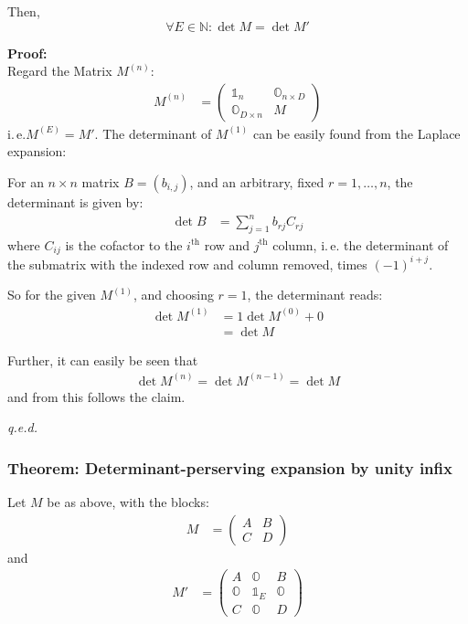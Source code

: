 \documentclass[
	english,
	a4paper,
	fontsize=10pt,
	parskip=half,
	titlepage=true,
	DIV=12,
	final
]{scrreprt}
\newcommand*{\ie}{i.\,e.\xspace}
\newcommand*{\setNaturals} {\ensuremath{\mathbb{N}}}
\begin{document}
Then,
\begin{equation}
	\forall E \in \setNaturals : \det M = \det M'
\end{equation}

\textbf{Proof:}\\
Regard the Matrix $M^{(n)}$:
\begin{align}
	M^{(n)}
&=
	\begin{pmatrix}
		\mathds{1}_{n} & \mathds{O}_{n \times D} \\
		\mathds{O}_{D \times n} & M
	\end{pmatrix}
\end{align}
\ie $M^{(E)} = M'$. The determinant of $M^{(1)}$ can be easily found from the Laplace expansion:

For an $n \times n$ matrix $B = (b_{i,j})$, and an arbitrary, fixed $r = 1, \ldots, n$, the determinant is given by:
\begin{align}
	\det B
&=
	\sum_{j=1}^{n}
		b_{rj} C_{rj}
\end{align}
where $C_{ij}$ is the cofactor to the $i^{\text{th}}$ row and $j^{\text{th}}$ column, \ie the determinant of the submatrix with the indexed row and column removed, times $(-1)^{i+j}$.

So for the given $M^{(1)}$, and choosing $r = 1$, the determinant reads:
\begin{align}
	\det M^{(1)}
&=
	1 \det M^{(0)} + 0 \\
&=
	\det M
\end{align}

Further, it can easily be seen that
\begin{align}
	\det M^{(n)} = \det M^{(n-1)} = \det M
\end{align}
and from this follows the claim.
\begin{flushright}
	\emph{q.e.d.}
\end{flushright}

\subsubsection{Theorem: Determinant-perserving expansion by unity infix}
Let $M$ be as above, with the blocks:
\begin{align}
	M
&=
	\begin{pmatrix}
		A & B \\ C & D
	\end{pmatrix}
\end{align}
and
\begin{align}
	M'
&=
	\begin{pmatrix}
		A & \mathds{O} & B \\
		\mathds{O} & \mathds{1}_{E} & \mathds{O} \\
		C & \mathds{O} & D
	\end{pmatrix}
\end{align}
\end{document}
